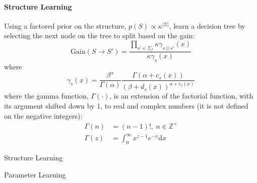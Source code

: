 \documentclass[12pt]{article}
\theoremstyle{plain}
\theoremstyle{definition}
\theoremstyle{remark}
\begin{document}
\paragraph{Structure Learning}
Using a factored prior on the structure, $p(S) \propto \kappa^{|\Sigma|}$,
learn a decision tree \citep{chihecmee97} by selecting the next node on the tree
to split based on the gain:
\begin{equation*}
  \mathrm{Gain}(S \to S') =
  \frac{\prod_{s'\in\Sigma_f}\kappa\gamma_{s \odot s'}(x)}{\kappa\gamma_s(x)}
\end{equation*}
where
\begin{equation*}
  \gamma_s(x) =
  \frac{\beta^{\alpha}}{\Gamma(\alpha)}\frac{\Gamma(\alpha + c_s(x))}{(\beta + d_s(x))^{\alpha + c_s(x)}}
\end{equation*}
where the gamma function, $\Gamma(\cdot)$, is an extension of the factorial
function, with its argument shifted down by 1, to real and complex numbers
(it is not defined on the negative integers):
\begin{align*}
  \Gamma(n) & = (n-1)!,\ n\in\mathbb{Z}^+ \\
  \Gamma(z) & = \int_0^{\infty}x^{z-1}e^{-x}\mathrm{d}x
\end{align*}

\begin{algorithm}[H]
\DontPrintSemicolon
{}
\Parameters{$\alpha,\beta,\kappa$}
\caption{Structure Learning}
\label{algo:structure}
\end{algorithm}

\begin{algorithm}[H]
\DontPrintSemicolon
{}
\Parameters{$\alpha,\beta$}
\caption{Parameter Learning}
\label{algo:parameters}
\end{algorithm}



\end{document}
